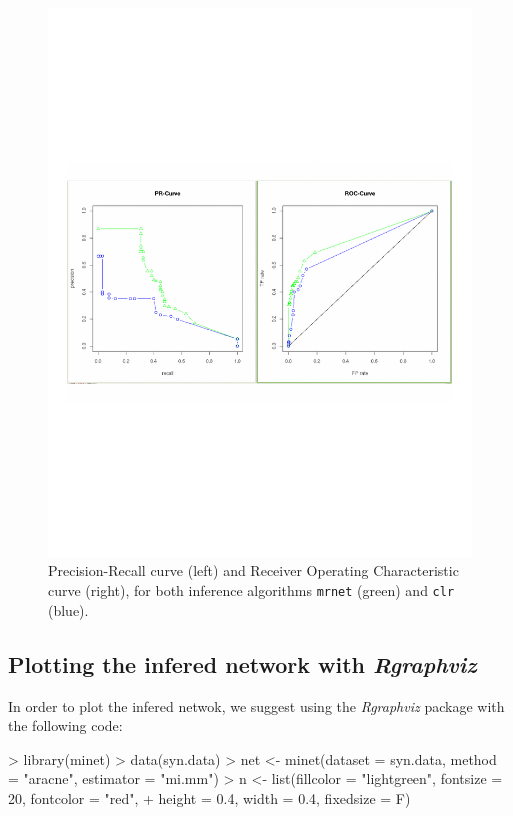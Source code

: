 \documentclass{article}
\newcommand{\Robject}[1]{{\texttt{#1}}}
\newcommand{\Rpackage}[1]{{\textit{#1}}}
\begin{document}
\begin{center}\begin{figure}
\label{fig:courbes}
\includegraphics[width=12cm]{courbes}
\caption{Precision-Recall curve (left) and Receiver Operating Characteristic curve (right), 
for both inference algorithms \Robject{mrnet} (green) and \Robject{clr} (blue).}
\end{figure}\end{center}

\subsection{Plotting the infered network with \Rpackage{Rgraphviz}}

In order to plot the infered netwok, we suggest using the \Rpackage{Rgraphviz} 
package with the following code:
\begin{Schunk}
\begin{Sinput}
> library(minet)
> data(syn.data)
> net <- minet(dataset = syn.data, method = "aracne", estimator = "mi.mm")
> n <- list(fillcolor = "lightgreen", fontsize = 20, fontcolor = "red", 
+     height = 0.4, width = 0.4, fixedsize = F)
\end{Sinput}
\end{Schunk}
\end{document}
